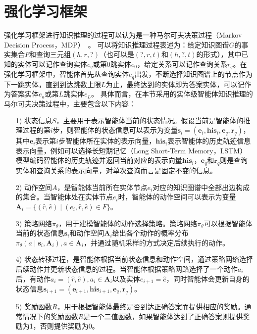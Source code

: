 \documentclass[algorithmlist, AutoFakeBold, AutoFakeSlant, figurelist, tablelist, nomlist, engineering]{seuthesix}
\begin{document}
\section{强化学习框架}
强化学习框架进行知识推理的过程可以认为是一种马尔可夫决策过程（Markov Decision Process，MDP）~\cite{gronauer2022multi}。
可以将知识推理过程表述为：给定知识图谱$G$的事实集合$F$和查询三元组$(h, r, ?)$（也可以是$(?, r, t)$和$(h, ?, t)$的形式），其中已知的实体可以记作查询实体$e_q$或第0跳实体$e_0$，给定关系可以记作查询关系$r_q$。在强化学习框架中，智能体首先从查询实体$e_q$出发，不断选择知识图谱上的节点作为下一跳实体，直到到达跳数上限$L$为止，最终达到的实体即为答案实体，可以记作为答案实体$e_a$或第$L$跳实体$e_L$。
具体而言，在本节采用的实体级智能体知识推理的马尔可夫决策过程中，主要包含以下内容：
\begin{itemize}
  \item [1)] 状态信息$S$，主要用于表示智能体当前的状态情况。假设当前是智能体的推理过程的第$i$步，则智能体的状态信息可以表示为变量$\bm{s}_i = (\bm{e}_i, \bm{his}_i, \bm{e}_q, \bm{r}_q)$，其中$\bm{e}_i$表示第$i$步智能体所在实体的表示向量，$\bm{his}_i$表示智能体的历史轨迹信息表示向量，例如可以选择长短期记忆（Long Short-Term Memory，LSTM）模型编码智能体的历史轨迹并返回当前对应的表示向量$\bm{his}_i$，$\bm{e}_q$和$\bm{r}_q$则是查询实体和查询关系的表示向量，对单次查询而言是固定不变的信息。
  \item [2)] 动作空间$A$，是智能体当前所在实体节点$e_i$对应的知识图谱中全部出边构成的集合。当智能体处在实体节点$e_i$时，智能体的动作空间可以表示为变量$\bm{A}_i = \{(\hat{r}, \hat{e}) \mid (e_i, \hat{r}, \hat{e}) \in F\}$。
  \item [3)] 策略网络$\pi_\theta$，用于建模智能体的动作选择策略。策略网络$\pi_\theta$可以根据智能体当前的状态信息$\bm{s}_i$和动作空间$\bm{A}_i$给出各个动作的概率分布$\pi_\theta(a \mid \bm{s}_i, \bm{A}_i), a \in \bm{A}_i$，并通过随机采样的方式决定后续执行的动作。
  \item [4)] 状态转移过程，是智能体根据当前状态信息和动作空间，通过策略网络选择后续动作并更新状态信息的过程。当智能体根据策略网路选择了一个动作$a_i$后，有动作$a_i = (\hat{r}, \hat{e}), a_i \in \bm{A}_i$以及实体$e_{i+1}=\hat{e}$，同时智能体会更新自身的状态信息$\bm{s}_{i+1} = (\bm{e}_{i+1}, \bm{his}_{i+1}, \bm{e}_q, \bm{r}_q)$。
  \item [5)] 奖励函数$R$，用于根据智能体最终是否到达正确答案而提供相应的奖励。通常情况下的奖励函数$R$是一个二值函数，如果智能体达到了正确答案则提供奖励为1，否则提供奖励为0。
\end{itemize}
\end{document}
